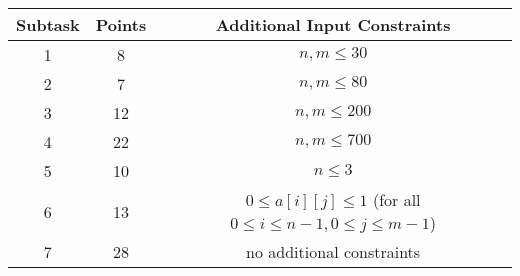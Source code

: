 \begin{center}
\renewcommand{\arraystretch}{1.5}
\begin{tabular}{|c|c|c|}
\hline
Subtask & Points & Additional Input Constraints\\
\hline
1 & 8 & $n, m \leq 30$ \\
\hline
2 & 7 & $n, m \leq 80$ \\
\hline
3 & 12 & $n, m \leq 200$ \\
\hline
4 & 22 & $n, m \leq 700$ \\
\hline
5 & 10 & $n \leq 3$ \\
\hline
6 & 13 & $0 \leq a[i][j] \leq 1$ (for all $0 \leq i \leq n-1, 0 \leq j \leq m-1$) \\
\hline
7 & 28 & no additional constraints \\
\hline
\end{tabular}
\end{center}